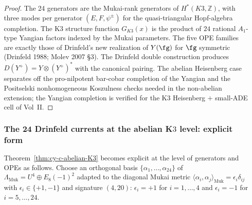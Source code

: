 \begin{proof}
The 24 generators are the Mukai-rank generators of $H^*(K3, \mathbb{Z})$,
with three modes per generator $(E, F, \psi^\pm)$ for the
quasi-triangular Hopf-algebra completion. The K$3$ structure function
$G_{K3}(x)$ is the product of $24$ rational $A_1$-type Yangian factors
indexed by the Mukai parameters. The five OPE families are exactly
those of Drinfeld's new realization of $Y(\fg)$ for $\fg$ symmetric
\textup{(}Drinfeld 1988; Molev 2007 \S3\textup{).} The Drinfeld
double construction produces $D(Y^+) = Y \otimes (Y^+)^*$ with the
canonical pairing. The abelian Heisenberg case separates off the
pro-nilpotent bar-cobar completion of the Yangian and the Positselski
nonhomogeneous Koszulness checks needed in the non-abelian extension;
the Yangian completion is verified for the K$3$ Heisenberg $+$ small-ADE
cell of Vol~II.
\end{proof}

\subsubsection{The 24 Drinfeld currents at the abelian K\texorpdfstring{$3$}{3} level: explicit form}
\label{subsubsec:k3-abelian-explicit-currents}

Theorem~\ref{thm:cy-c-abelian-K3} becomes explicit at the level of
generators and OPEs as follows. Choose an orthogonal basis
$\{\alpha_1, \dots, \alpha_{24}\}$ of $\Lambda_{\mathrm{Muk}} = U^4 \oplus E_8(-1)^2$
adapted to the diagonal Mukai metric $\langle \alpha_i, \alpha_j \rangle_{\mathrm{Muk}}
= \epsilon_i \delta_{ij}$ with $\epsilon_i \in \{+1, -1\}$ and signature $(4, 20)$:
$\epsilon_i = +1$ for $i = 1, \dots, 4$ and $\epsilon_i = -1$ for $i = 5, \dots, 24$.

